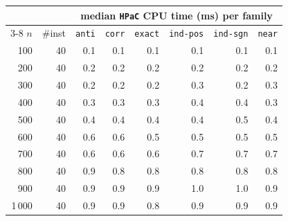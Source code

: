 \begin{tabular}{@{}rrrrrrrr@{}}
\toprule
 &  & \multicolumn{6}{c}{median \texttt{HPaC} CPU time (ms) per family} \\
\cmidrule(l){3-8}
$n$ & \#inst & \texttt{anti} & \texttt{corr} & \texttt{exact} & \texttt{ind-pos} & \texttt{ind-sgn} & \texttt{near} \\
\midrule
100 & 40 & 0.1 & 0.1 & 0.1 & 0.1 & 0.1 & 0.1 \\
200 & 40 & 0.2 & 0.2 & 0.2 & 0.2 & 0.2 & 0.2 \\
300 & 40 & 0.2 & 0.2 & 0.2 & 0.3 & 0.2 & 0.3 \\
400 & 40 & 0.3 & 0.3 & 0.3 & 0.4 & 0.4 & 0.3 \\
500 & 40 & 0.4 & 0.4 & 0.4 & 0.4 & 0.5 & 0.4 \\
600 & 40 & 0.6 & 0.6 & 0.5 & 0.5 & 0.5 & 0.5 \\
700 & 40 & 0.6 & 0.6 & 0.6 & 0.7 & 0.7 & 0.7 \\
800 & 40 & 0.9 & 0.8 & 0.8 & 0.8 & 0.8 & 0.8 \\
900 & 40 & 0.9 & 0.9 & 0.9 & 1.0 & 1.0 & 0.9 \\
1\,000 & 40 & 0.9 & 0.9 & 0.8 & 0.9 & 0.9 & 0.9 \\
\bottomrule
\end{tabular}
